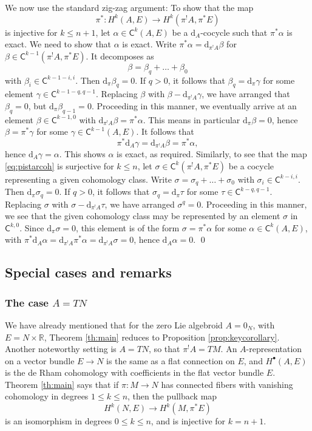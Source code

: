 \documentclass[11pt]{amsart}
\theoremstyle{definition}
\theoremstyle{remark}
\newcommand{\R}{\mathbb{R}}
\renewcommand{\d}{{\mbox{d}}}
\newcommand{\CC}{\mathsf{C}}
\begin{document}
We now use the standard zig-zag argument: To show that the map 
\begin{equation}\label{eq:pistarcoh}
	 \pi^*\colon H^k(A,E)\to H^k(\pi^!A,\pi^*E)
\end{equation}
is injective for $k\le n+1$, let $\alpha\in \CC^k(A,E)$ be a $\d_A$-cocycle such that $\pi^*\alpha$ is exact. We need to show that $\alpha$ is exact. Write $\pi^*\alpha=\d_{\pi^! A}\beta$ for $\beta\in \CC^{k-1}(\pi^!A,\pi^*E)$. 
It decomposes as 
\[ \beta=\beta_q+\ldots+\beta_0\]
with $\beta_i\in \CC^{k-1-i,i}$. Then $\d_\pi \beta_q=0$. If $q>0$, it follows that $\beta_q=\d_\pi \gamma$
for some element $\gamma\in \CC^{k-1-q,q-1}$. 
Replacing $\beta$ with $\beta-\d_{\pi^!A}\gamma$, we have arranged that $\beta_q=0$, but $\d_\pi \beta_{q-1}=0$. 
Proceeding in this manner, 
we eventually arrive at an element  $\beta\in \CC^{k-1,0}$ with $\d_{\pi^!A}\beta=\pi^*\alpha$. This means in particular $\d_\pi\beta=0$, hence 
$\beta=\pi^*\gamma$ for some $\gamma\in \CC^{k-1}(A,E)$. It follows that 
\[ \pi^*\d_A\gamma=\d_{\pi^!A}\beta=\pi^*\alpha,\]
hence $\d_A\gamma=\alpha$. This shows $\alpha$ is exact, as required. 
Similarly, to see that the map \eqref{eq:pistarcoh} is surjective for $k\le n$, let $\sigma\in  \CC^{k}(\pi^!A,\pi^*E)$ be a cocycle
representing a given cohomology class. Write 
$\sigma=\sigma_q+\ldots+\sigma_0$ with $\sigma_i\in \CC^{k-i,i}$. Then $\d_\pi\sigma_q=0$. If $q>0$, it follows that 
$\sigma_q=\d_\pi\tau$ for some $\tau\in \CC^{k-q,q-1}$. Replacing $\sigma$ with $\sigma-\d_{\pi^!A}\tau$, we have arranged $\sigma^q=0$. 
Proceeding in this manner, we see that the given cohomology class may be represented by an element $\sigma$ in $\CC^{k,0}$. Since 
$\d_\pi\sigma=0$, this element is of the form $\sigma=\pi^*\alpha$ for some $\alpha\in \CC^k(A,E)$, with $\pi^*\d_A\alpha
=\d_{\pi^!A}\pi^*\alpha=\d_{\pi^!A}\sigma=0$, hence $\d_A\alpha=0$. 
 \qed
 
 
 \subsection{Special cases and remarks}
 
 \subsubsection{The case $A=TN$}
 We have already mentioned that for the zero Lie algebroid $A=0_N$, with $E=N\times \R$, Theorem \ref{th:main} reduces to Proposition \ref{prop:keycorollary}. Another noteworthy setting is $A=TN$, so that $\pi^!A=TM$. An $A$-representation on a vector bundle $E\to N$ is the same as a flat connection on $E$, and $H^\bullet(A,E)$ is the de Rham cohomology with coefficients in the flat vector bundle $E$. 
 Theorem \ref{th:main}  says that if $\pi\colon M\to N$ has connected fibers with vanishing cohomology in degrees $1\le k\le n$, then the pullback map 
 \[ H^k(N,E)\to H^k(M,\pi^*E)\] 
  is an isomorphism in degrees $0\le k\le n$, and is injective for $k=n+1$. 
  
\end{document}
